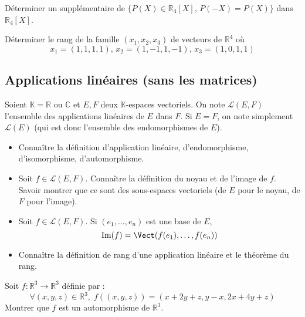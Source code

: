 \documentclass[a4paper,twoside,french,11pt]{VcCours}
\begin{document}
\begin{Exercice}{}
  Déterminer un supplémentaire de $\lbrace P(X) \in \mathbb{R}_4[X], \, P(-X)=P(X)\rbrace$ dans $\mathbb{R}_4[X]$.
\end{Exercice} 

\begin{Exercice}{}
  Déterminer le rang de la famille $(x_1,x_2,x_3)$ de vecteurs de $\mathbb{R}^4$ où
  $$ x_1 = (1,1,1,1), \, x_2 = (1, - 1,1, - 1), \, x_3 = (1,0,1,1)$$
\end{Exercice} 
  
\subsection{Applications linéaires (sans les matrices)}

Soient $\mathbb{K}= \mathbb{R}$ ou $\mathbb{C}$ et $E, F$ deux $\mathbb{K}$-espaces vectoriels. On note $\mathcal{L}(E,F)$ l'ensemble des applications linéaires de $E$ dans $F$. Si $E=F$, on note simplement $\mathcal{L}(E)$ (qui est donc l'ensemble des endomorphismes de $E$).

\begin{ptc}{}

\begin{itemize}
\item Connaître la définition d'application linéaire, d'endomorphisme, d'isomorphisme, d'automorphisme.
\item Soit $f \in \mathcal{L}(E,F)$. Connaître la définition du noyau et de l'image de $f$. Savoir montrer que ce sont des sous-espaces vectoriels (de $E$ pour le noyau, de $F$ pour l'image).
\item Soit $f \in \mathcal{L}(E,F)$. Si $(e_1, \ldots, e_n)$ est une base de $E$,
$$ \textrm{Im}(f) = \Vect(f(e_1), \ldots, f(e_n))$$
\item Connaître la définition de rang d'une application linéaire et le théorème du rang.
\end{itemize} 
\end{ptc}
%

\begin{Exercice}{}
  Soit $f : \mathbb{R}^3 \rightarrow \mathbb{R}^3$ définie par :
  $$ \forall (x,y,z) \in \mathbb{R}^3, \; f((x,y,z))= (x+2y+z,y-x,2x+4y+z)$$
  Montrer que $f$ est un automorphisme de $\mathbb{R}^3$.
\end{Exercice} 
\end{document}
